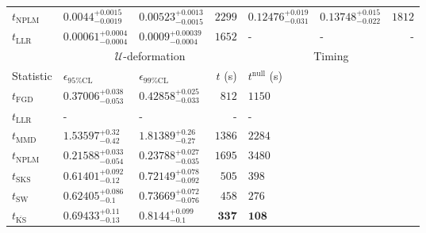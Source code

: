 \begin{tabular}{l|llr|llr}
\rowcolor{red!35}	$t_{\mathrm{NPLM}}$ & $0.0044_{-0.0019}^{+0.0015}$ & $0.00523_{-0.0015}^{+0.0013}$ & $2299$ & $0.12476_{-0.031}^{+0.019}$ & $0.13748_{-0.022}^{+0.015}$ & $1812$ \\
	$t_{\mathrm{LLR}}$ & $0.00061_{-0.0004}^{+0.0004}$ & $0.0009_{-0.0004}^{+0.00039}$ & $1652$ & - & - & - \\
	\toprule
	\multicolumn{1}{c}{} & \multicolumn{3}{c}{$\mathcal{U}$-deformation} & \multicolumn{3}{c}{Timing} \\
	Statistic & $\epsilon_{95\%\mathrm{CL}}$ & $\epsilon_{99\%\mathrm{CL}}$ & $t$ (s) & $t^{\mathrm{null}}$ (s) \\
	\midrule
	$t_{\mathrm{FGD}}$ & ${\mathbf{0.37006_{-0.053}^{+0.038}}}$ & ${\mathbf{0.42858_{-0.033}^{+0.025}}}$ & $812$ & $1150$ \\
	$t_{\mathrm{LLR}}$ & - & - & - & - \\
	$t_{\mathrm{MMD}}$ & $1.53597_{-0.42}^{+0.32}$ & $1.81389_{-0.27}^{+0.26}$ & $1386$ & $2284$ \\
\rowcolor{red!35}	$t_{\mathrm{NPLM}}$ & $0.21588_{-0.054}^{+0.033}$ & $0.23788_{-0.035}^{+0.027}$ & $1695$ & $3480$ \\
	$t_{\mathrm{SKS}}$ & $0.61401_{-0.12}^{+0.092}$ & $0.72149_{-0.092}^{+0.078}$ & $505$ & $398$ \\
	$t_{\mathrm{SW}}$ & $0.62405_{-0.1}^{+0.086}$ & $0.73669_{-0.076}^{+0.072}$ & $458$ & $276$ \\
	$t_{\overline{\mathrm{KS}}}$ & $0.69433_{-0.13}^{+0.11}$ & $0.8144_{-0.1}^{+0.099}$ & ${\mathbf{337}}$ & ${\mathbf{108}}$ \\
	\bottomrule
\end{tabular}